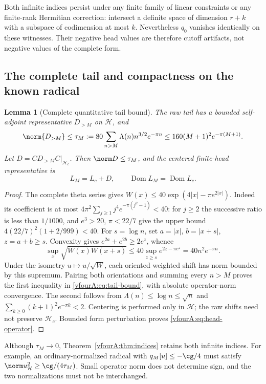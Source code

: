 \documentclass[11pt,a4paper]{article}
\numberwithin{equation}{section}
\newtheorem{lemma}[theorem]{Lemma}
\theoremstyle{definition}\newtheorem{definition}[theorem]{Definition}
\theoremstyle{remark}\newtheorem{remark}[theorem]{Remark}
\newcommand{\Hh}{\mathcal H}\newcommand{\Hw}{\mathcal H}
\newcommand{\dom}{\operatorname{Dom}}\newcommand{\Var}{\operatorname{Var}}
\begin{document}
Both infinite indices persist under any finite family of linear
constraints or any finite-rank Hermitian correction: intersect a
definite space of dimension $r+k$ with a subspace of codimension at
most $k$.  Nevertheless $q_0$ vanishes identically on these witnesses.
Their negative head values are therefore cutoff artifacts, not
negative values of the complete form.

\subsection{The complete tail and compactness on the known radical}
\label{vfourA:subsec:compactness}

\begin{lemma}[Complete quantitative tail bound]\label{vfourA:lem:tail}
The raw tail has a bounded self-adjoint representative $D_{>M}$ on
$\Hh$, and
\begin{equation}\label{vfourA:eq:tail-bound}
 \norm{D_{>M}}\le\tau_M
 :=80\sum_{n>M}\Lambda(n)n^{3/2}e^{-\pi n}
 \le160(M+1)^2e^{-\pi(M+1)}.
\end{equation}
Let $D=CD_{>M}C|_{\Hh_c}$.  Then $\norm D\le\tau_M$, and the centered
finite-head representative is
\begin{equation}\label{vfourA:eq:head-operator}
 L_M=L_c+D,\qquad \dom L_M=\dom L_c.
\end{equation}
\end{lemma}
\begin{proof}
The complete theta series gives
$W(x)\le40\exp(4|x|-\pi e^{2|x|})$.
Indeed its coefficient is at most
$4\pi^2\sum_{j\ge1}j^4e^{-\pi(j^2-1)}<40$:
for $j\ge2$ the successive ratio is less than $1/1000$, and
$e^3>20$, $\pi<22/7$ give the upper bound
$4(22/7)^2(1+2/999)<40$.
For $s=\log n$, set $a=|x|$, $b=|x+s|$, $z=a+b\ge s$.
Convexity gives $e^{2a}+e^{2b}\ge2e^z$, whence
\[
 \sup_x\sqrt{W(x)W(x+s)}
 \le40\sup_{z\ge s}e^{2z-\pi e^z}
 =40n^2e^{-\pi n}.
\]
Under the isometry $u\mapsto u/\sqrt W$, each oriented weighted
shift has norm bounded by this supremum.  Pairing both orientations
and summing every $n>M$ proves the first inequality in
\eqref{vfourA:eq:tail-bound}, with absolute operator-norm convergence.
The second follows from $\Lambda(n)\le\log n\le\sqrt n$ and
$\sum_{k\ge0}(k+1)^2e^{-\pi k}<2$.
Centering is performed only in $\Hh$; the raw shifts need not
preserve $\Hh_c$.  Bounded form perturbation proves
\eqref{vfourA:eq:head-operator}.
\end{proof}

Although $\tau_M\to0$, Theorem~\ref{vfourA:thm:indices} retains both
infinite indices.  For example, an ordinary-normalized radical with
$q_M[u]\le-\cg/4$ must satisfy
$\norm u_{\Hh}^2\ge\cg/(4\tau_M)$.  Small operator norm does not
determine sign, and the two normalizations must not be interchanged.
\end{document}
